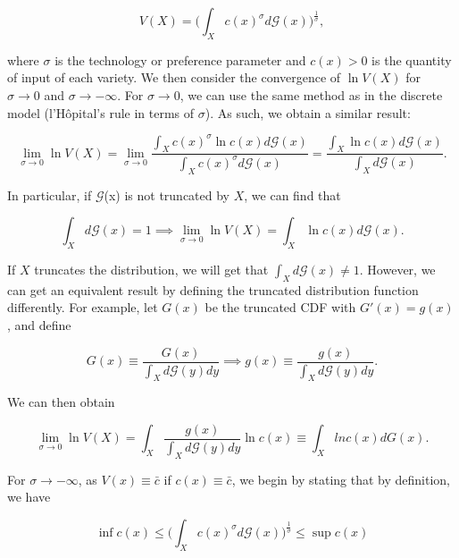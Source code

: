 \begin{equation}
V(X) = \bigg(\int_X c(x)^\sigma d\mathcal{G}(x)\bigg)^{\frac{1}{\sigma}},
\end{equation}

where $\sigma$ is the technology or preference parameter and $c(x) > 0$ is the quantity of input of each variety. We then consider the convergence of $\ln V(X)$ for $\sigma \rightarrow 0$ and $\sigma \rightarrow -\infty$. For $\sigma \rightarrow 0$, we can use the same method as in the discrete model (l'H\^{o}pital's rule in terms of $\sigma$). As such, we obtain a similar result:

\begin{equation}
\lim\limits_{\sigma \rightarrow 0}\ln V(X) = \lim\limits_{\sigma \rightarrow 0}\frac{\int_X c(x)^\sigma \ln c(x) d \mathcal{G}(x)}{\int_X c(x)^\sigma d \mathcal{G}(x)} = \frac{\int_X \ln c(x) d \mathcal{G}(x)}{\int_X d \mathcal{G}(x)}.
\end{equation}

In particular, if $\mathcal{G}$(x) is not truncated by $X$, we can find that

\begin{equation*}
\int_X d\mathcal{G}(x) = 1 \implies \lim\limits_{\sigma \rightarrow 0}\ln V(X) = \int_X \ln c(x) d\mathcal{G}(x).
\end{equation*}

If $X$ truncates the distribution, we will get that $\int_X d\mathcal{G}(x) \neq 1$. However, we can get an equivalent result by defining the truncated distribution function differently. For example, let $G(x)$ be the truncated CDF with $G'(x) = g(x)$, and define

\begin{equation}
G(x) \equiv \frac{G(x)}{\int_X d \mathcal{G}(y) dy} \implies g(x) \equiv \frac{g(x)}{\int_X d \mathcal{G}(y) dy}.
\end{equation}

We can then obtain

\begin{equation}
\lim\limits_{\sigma \rightarrow 0}\ln V(X) = \int_X \frac{g(x)}{\int_X d \mathcal{G}(y) dy} \ln c(x) \equiv \int_X ln c(x) d G(x).
\end{equation}

For $\sigma \rightarrow -\infty$, as $V(x) \equiv \bar{c}$ if $c(x) \equiv \bar{c}$, we begin by stating that by definition, we have

\begin{equation}\label{eq:infsupcont}
\inf c(x) \leq \bigg(\int_X c(x)^\sigma d\mathcal{G}(x)\bigg)^{\frac{1}{\sigma}} \leq \sup c(x)
\end{equation}

